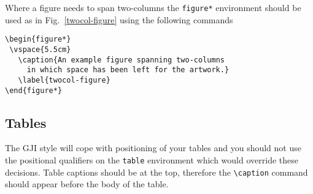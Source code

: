 \documentclass{gji}
\begin{document}
Where a figure needs to span two-columns the \verb"figure*" environment
should be used as in  Fig.~\ref{twocol-figure} using the following commands
\begin{verbatim}
\begin{figure*}
 \vspace{5.5cm}
   \caption{An example figure spanning two-columns
     in which space has been left for the artwork.}
   \label{twocol-figure}
\end{figure*}
\end{verbatim}

\subsection{Tables}

The GJI style will cope with positioning of your tables and you
should not use the positional qualifiers on the
\verb"table" environment which would override these decisions. Table
captions should be at the top, therefore the \verb"\caption" command
should appear before the body of the table.
\end{document}
